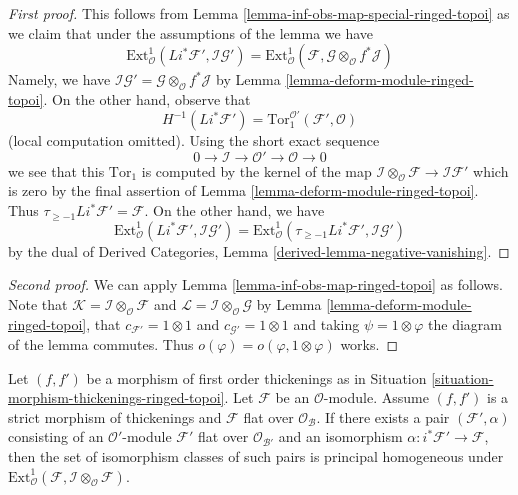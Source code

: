\begin{proof}[First proof]
This follows from Lemma \ref{lemma-inf-obs-map-special-ringed-topoi}
as we claim that under the assumptions of the lemma we have
$$
\text{Ext}^1_\mathcal{O}(Li^*\mathcal{F}', \mathcal{I}\mathcal{G}') =
\text{Ext}^1_\mathcal{O}(\mathcal{F},
\mathcal{G} \otimes_\mathcal{O} f^*\mathcal{J})
$$
Namely, we have
$\mathcal{I}\mathcal{G}' =
\mathcal{G} \otimes_\mathcal{O} f^*\mathcal{J}$
by Lemma \ref{lemma-deform-module-ringed-topoi}.
On the other hand, observe that
$$
H^{-1}(Li^*\mathcal{F}') =
\text{Tor}_1^{\mathcal{O}'}(\mathcal{F}', \mathcal{O})
$$
(local computation omitted). Using the short exact sequence
$$
0 \to \mathcal{I} \to \mathcal{O}' \to \mathcal{O} \to 0
$$
we see that this $\text{Tor}_1$ is computed by the kernel of the map
$\mathcal{I} \otimes_\mathcal{O} \mathcal{F} \to \mathcal{I}\mathcal{F}'$
which is zero by the final assertion of
Lemma \ref{lemma-deform-module-ringed-topoi}.
Thus $\tau_{\geq -1}Li^*\mathcal{F}' = \mathcal{F}$.
On the other hand, we have
$$
\text{Ext}^1_\mathcal{O}(Li^*\mathcal{F}',
\mathcal{I}\mathcal{G}') =
\text{Ext}^1_\mathcal{O}(\tau_{\geq -1}Li^*\mathcal{F}',
\mathcal{I}\mathcal{G}')
$$
by the dual of
Derived Categories, Lemma \ref{derived-lemma-negative-vanishing}.
\end{proof}

\begin{proof}[Second proof]
We can apply Lemma \ref{lemma-inf-obs-map-ringed-topoi} as follows. Note that
$\mathcal{K} = \mathcal{I} \otimes_\mathcal{O} \mathcal{F}$ and
$\mathcal{L} = \mathcal{I} \otimes_\mathcal{O} \mathcal{G}$
by Lemma \ref{lemma-deform-module-ringed-topoi}, that
$c_{\mathcal{F}'} = 1 \otimes 1$ and $c_{\mathcal{G}'} = 1 \otimes 1$
and taking $\psi = 1 \otimes \varphi$ the diagram of the lemma
commutes. Thus $o(\varphi) = o(\varphi, 1 \otimes \varphi)$
works.
\end{proof}

\begin{lemma}
\label{lemma-inf-ext-rel-ringed-topoi}
Let $(f, f')$ be a morphism of first order thickenings as in
Situation \ref{situation-morphism-thickenings-ringed-topoi}.
Let $\mathcal{F}$ be an $\mathcal{O}$-module.
Assume $(f, f')$ is a strict morphism of thickenings and
$\mathcal{F}$ flat over $\mathcal{O}_\mathcal{B}$. If there exists a pair
$(\mathcal{F}', \alpha)$ consisting of an
$\mathcal{O}'$-module $\mathcal{F}'$ flat over $\mathcal{O}_{\mathcal{B}'}$
and an isomorphism
$\alpha : i^*\mathcal{F}' \to \mathcal{F}$, then the set of
isomorphism classes of such pairs is principal homogeneous
under
$\text{Ext}^1_\mathcal{O}(
\mathcal{F}, \mathcal{I} \otimes_\mathcal{O} \mathcal{F})$.
\end{lemma}

